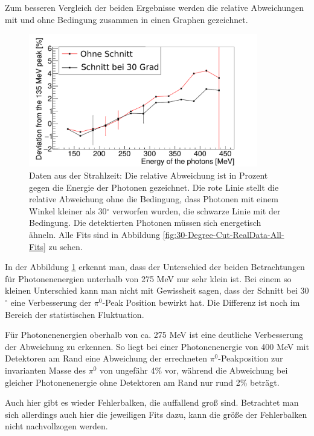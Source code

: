 \documentclass[a4paper,11pt,oneside,final,german,openbib,pdftex]{scrbook}
\begin{document}
{Zum besseren Vergleich der beiden Ergebnisse werden die relative Abweichungen mit und ohne Bedingung zusammen in einen Graphen gezeichnet.
\begin{figure}[h!]
	\begin{center}
		\includegraphics[width=100mm]{20170405StrahlzeitBothDeviation}
		\caption[Strahlzeit: Vernachl\"assigung der Detektoren am Rand; Abweichung]{Daten aus der Strahlzeit: Die relative Abweichung ist in Prozent gegen die Energie der Photonen gezeichnet. Die rote Linie stellt die relative Abweichung ohne die Bedingung, dass Photonen mit einem Winkel kleiner als 30$^{\circ}$ verworfen wurden, die schwarze Linie mit der Bedingung. Die detektierten Photonen m\"ussen sich energetisch \"ahneln. Alle Fits sind in Abbildung \ref{fig:30-Degree-Cut-RealData-All-Fits} zu sehen.}
		\label{fig:Vernachlaessigung-Detektoren-am-Rand}
	\end{center}
\end{figure}

 

In der Abbildung \ref{fig:Vernachlaessigung-Detektoren-am-Rand} erkennt man, dass der Unterschied der beiden Betrachtungen f\"ur Photonenenergien unterhalb von 275 MeV nur sehr klein ist. Bei einem so kleinen Unterschied kann man nicht mit Gewissheit sagen, dass der Schnitt bei 30$^{\circ}$ eine Verbesserung der $\pi^0$-Peak Position bewirkt hat. Die Differenz ist noch im Bereich der statistischen Fluktuation. 

F\"ur Photonenenergien oberhalb von ca. 275 MeV ist eine deutliche Verbesserung der Abweichung zu erkennen. So liegt bei einer Photonenenergie von 400 MeV mit Detektoren am Rand eine Abweichung der errechneten $\pi^0$-Peakposition zur invarianten Masse des $\pi^0$ von ungefähr 4\% vor, w\"ahrend die Abweichung bei gleicher Photonenenergie ohne Detektoren am Rand nur rund 2\% betr\"agt. 

Auch hier gibt es wieder Fehlerbalken, die auffallend gro{\ss} sind. Betrachtet man sich allerdings auch hier die jeweiligen Fits dazu, kann die gr\"o{\ss}e der Fehlerbalken nicht nachvollzogen werden.

}
\end{document}
